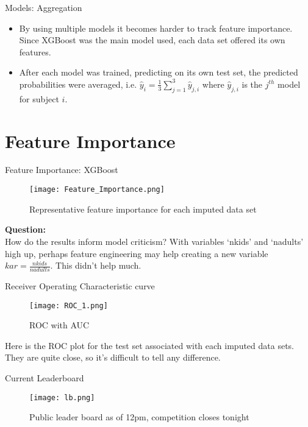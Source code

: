 \documentclass{beamer}
\begin{document}
\begin{frame}{Models: Aggregation}
\begin{itemize}
\item By using multiple models it becomes harder to track feature importance. Since XGBoost was the main model used, each data set offered its own features.
\item After each model was trained, predicting on its own test set, the predicted probabilities were averaged, i.e. $\hat{y}_i = \frac{1}{3}\sum\limits_{j=1}^{3} \hat{y}_{j,i}$ where $\hat{y}_{j,i}$ is the $j^{th}$ model for subject $i$.
\end{itemize}
\end{frame}

\section{Feature Importance}
\begin{frame}{Feature Importance: XGBoost}
\begin{figure}
  \texttt{[image: Feature\_Importance.png]}
    \caption{Representative feature importance for each imputed data set}
  \label{fig:impute}
\end{figure}
\textbf{Question:}\\
How do the results inform model criticism? With variables `nkids' and `nadults' high up, perhaps feature engineering may help creating a new variable $kar = \frac{nkids}{nadults}$. This didn't help much.
\end{frame}

\begin{frame}{Receiver Operating Characteristic curve}
\begin{figure}
  \texttt{[image: ROC\_1.png]}
    \caption{ROC with AUC}
  \label{fig:roc}
\end{figure}
Here is the ROC plot for the test set associated with each imputed data sets. They are quite close, so it's difficult to tell any difference.
\end{frame}

\begin{frame}{Current Leaderboard}
\begin{figure}
  \texttt{[image: lb.png]}
    \caption{Public leader board as of 12pm, competition closes tonight}
  \label{fig:lb}
\end{figure}
\end{frame}
\end{document}

